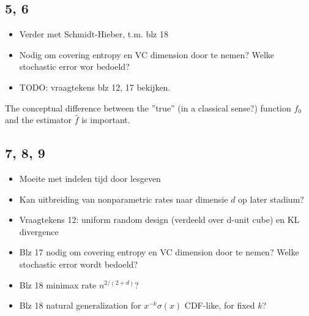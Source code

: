 \subsection*{5, 6}
\begin{itemize}
    \item Verder met Schmidt-Hieber, t.m. blz 18
    \item Nodig om covering entropy en VC dimension door te nemen? Welke stochastic error wor bedoeld?
    \item TODO: vraagtekens blz 12, 17 bekijken.
\end{itemize}
The conceptual difference between the ''true'' (in a classical sense?) function $f_0$ and the estimator $\hat{f}$ is important.


\subsection*{7, 8, 9}
\begin{itemize}
    \item Moeite met indelen tijd door lesgeven
    \item Kan uitbreiding van nonparametric rates naar dimensie $d$ op later stadium?
    \item Vraagtekens 12: uniform random design (verdeeld over d-unit cube) en KL divergence
    \item Blz 17 nodig om covering entropy en VC dimension door te nemen? Welke stochastic error wordt bedoeld?
    \item Blz 18 minimax rate $n^{2/(2+d)}$?
    \item Blz 18 natural generalization for $x^{-k} \sigma(x)$ CDF-like, for fixed $k$?
\end{itemize}
